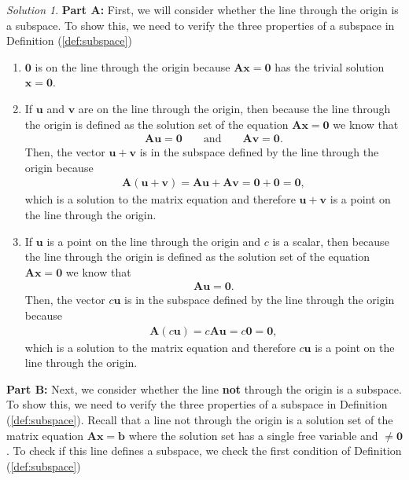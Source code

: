 \documentclass[
]{book}
\theoremstyle{definition}
\theoremstyle{definition}
\theoremstyle{definition}
\theoremstyle{remark}
\newtheorem*{solution}{Solution}
\begin{document}
\begin{solution}

\textbf{Part A:} First, we will consider whether the line through the origin is a subspace. To show this, we need to verify the three properties of a subspace in Definition (\ref{def:subspace})

\begin{enumerate}
\def\labelenumi{\arabic{enumi})}
\item
  \(\mathbf{0}\) is on the line through the origin because \(\mathbf{A} \mathbf{x} = \mathbf{0}\) has the trivial solution \(\mathbf{x} = \mathbf{0}\).
\item
  If \(\mathbf{u}\) and \(\mathbf{v}\) are on the line through the origin, then because the line through the origin is defined as the solution set of the equation \(\mathbf{A} \mathbf{x} = \mathbf{0}\) we know that
  \[
  \begin{aligned}
  \mathbf{A} \mathbf{u} = \mathbf{0} && \mbox{ and } && \mathbf{A} \mathbf{v} = \mathbf{0}.
  \end{aligned}
  \]
  Then, the vector \(\mathbf{u} + \mathbf{v}\) is in the subspace defined by the line through the origin because
  \[
  \begin{aligned}
  \mathbf{A} (\mathbf{u} + \mathbf{v}) = \mathbf{A} \mathbf{u} + \mathbf{A} \mathbf{v} = \mathbf{0} + \mathbf{0} = \mathbf{0},
  \end{aligned}
  \]
  which is a solution to the matrix equation and therefore \(\mathbf{u} + \mathbf{v}\) is a point on the line through the origin.
\item
  If \(\mathbf{u}\) is a point on the line through the origin and \(c\) is a scalar, then because the line through the origin is defined as the solution set of the equation \(\mathbf{A} \mathbf{x} = \mathbf{0}\) we know that
  \[
  \begin{aligned}
  \mathbf{A} \mathbf{u} = \mathbf{0}.
  \end{aligned}
  \]
  Then, the vector \(c \mathbf{u}\) is in the subspace defined by the line through the origin because
  \[
  \begin{aligned}
  \mathbf{A} (c \mathbf{u}) = c \mathbf{A} \mathbf{u}  = c \mathbf{0} = \mathbf{0},
  \end{aligned}
  \]
  which is a solution to the matrix equation and therefore \(c \mathbf{u}\) is a point on the line through the origin.
\end{enumerate}

\textbf{Part B:} Next, we consider whether the line \textbf{not} through the origin is a subspace. To show this, we need to verify the three properties of a subspace in Definition (\ref{def:subspace}). Recall that a line not through the origin is a solution set of the matrix equation \(\mathbf{A} \mathbf{x} = \mathbf{b}\) where the solution set has a single free variable and \(\mathbf \neq \mathbf{0}\). To check if this line defines a subspace, we check the first condition of Definition (\ref{def:subspace})


\end{solution}
\end{document}
